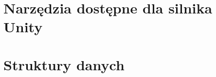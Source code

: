 \documentclass[nostrict]{Szablon}
\begin{document}









\section{Narzędzia dostępne dla silnika Unity}


\section{Struktury danych}









\end{document}
